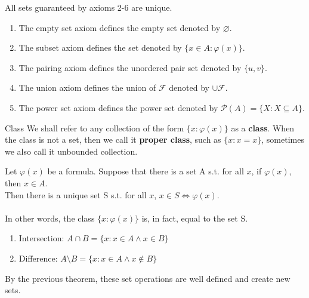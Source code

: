 \begin{remark}
    All sets guaranteed by axioms 2-6 are unique. \\
    \begin{enumerate}
        \item The empty set axiom defines the empty set denoted by $\varnothing$.\\
        \item The subset axiom defines the set denoted by $\{x \in A:\varphi(x)\}$.\\
        \item The pairing axiom defines the unordered pair set denoted by $\{u, v\}$.\\
        \item The union axiom defines the union of $\mathcal{F}$ denoted by $\cup \mathcal{F}$.\\
        \item The power set axiom defines the power set denoted by $\mathcal{P}(A) = \{X:X \subseteq A\}.$
    \end{enumerate}
\end{remark}

\begin{definition}{Class}{}
    We shall refer to any collection of the form $\{x:\varphi(x)\}$ as a \textbf{class}. When the class is not a set, then we call it \textbf{proper class}, such as $\{x:x=x\}$, sometimes we also call it unbounded collection.
\end{definition}

\begin{theorem}{}{}
    Let $\varphi(x)$ be a formula. Suppose that there is a set A s.t. for all $x$, if $\varphi(x)$, then $x \in A$.\\
    Then there is a unique set S s.t. for all $x$, $x \in S \iff \varphi(x)$. \\
    \\
    In other words, the class $\{x:\varphi(x)\}$ is, in fact, equal to the set S.
\end{theorem}

\begin{corollary}{}{}
    \begin{enumerate}
        \item Intersection: $A \cap B = \{x:x \in A \land x \in B\}$\\
        \item Difference: $A \setminus B = \{x:x \in A \land x \notin B\}$ \\
    \end{enumerate}
    By the previous theorem, these set operations are well defined and create new sets.
\end{corollary}
